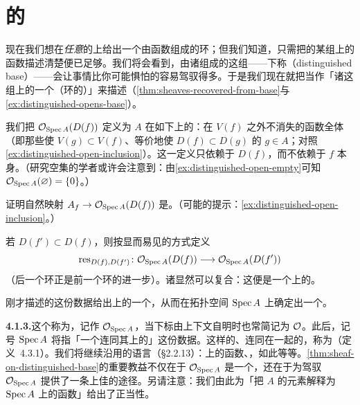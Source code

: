 
\section{\trAffineScheme{}的\trStructureSheaf}

现在我们想在\emph{任意}的\trOpenSet{}上给出一个由函数组成的环；但我们知道，只需把\trTopology{}的某组\trBase{}上的函数描述清楚便已足够。我们将会看到，由诸\trDistinguishedOpen{}组成的这组\trBase——下称\textbf{\trDistinguishedBase{}}（distinguished base）——会让事情比你可能惧怕的容易驾驭得多。于是我们现在就把\trStructureSheaf{}当作「诸\trDistinguishedOpen{}这组\trBase{}上的一个（环的）\trSheaf」来描述（\cref{thm:sheaves-recovered-from-base}与\cref{ex:distinguished-opens-base}）。

\begin{definition}\label{thm:structure-sheaf-definition}
我们把 $\mathcal{O}_{\operatorname{Spec} A}(D(f))$ 定义为 $A$ 在如下\trMultiplicativeSubset{}上的\trLocalization：在 $V(f)$ 之外不消失的函数全体（即那些使 $V(g)\subset V(f)$、等价地使 $D(f)\subset D(g)$ 的 $g\in A$；对照\cref{ex:distinguished-open-inclusion}）。这一定义只依赖于 $D(f)$，而不依赖于 $f$ 本身。（研究空集的学者或许会注意到：由\cref{ex:distinguished-open-empty}可知 $\mathcal{O}_{\operatorname{Spec} A}(\varnothing)=\{0\}$。）
\end{definition}

\begin{exercise}[极好练习]\label{ex:af-structure-sheaf-isomorphism}
证明自然映射 $A_f\to\mathcal{O}_{\operatorname{Spec} A}(D(f))$ 是\trIsomorphism。（可能的提示：\cref{ex:distinguished-open-inclusion}。）
\end{exercise}

若 $D(f')\subset D(f)$，则按显而易见的方式定义\trRestrictionMap
\[
\mathrm{res}_{D(f),D(f')}\colon\mathcal{O}_{\operatorname{Spec} A}(D(f))\longrightarrow\mathcal{O}_{\operatorname{Spec} A}(D(f'))
\]
（后一个环正是前一个环的进一步\trLocalization）。诸\trRestrictionMap{}显然可以复合：这便是一个\trDistinguishedBase{}上的\trPresheaf。

\begin{theorem}\label{thm:sheaf-on-distinguished-base}
刚才描述的这份数据给出\trDistinguishedBase{}上的一个\trSheaf，从而在拓扑空间 $\operatorname{Spec} A$ 上确定出一个\trSheaf。
\end{theorem}

\textbf{4.1.3.}\quad 这个\trSheaf{}称为\textbf{\trStructureSheaf}，记作 $\mathcal{O}_{\operatorname{Spec} A}$，当下标由上下文自明时也常简记为 $\mathcal{O}$。此后，记号 $\operatorname{Spec} A$ 将指「一个\trTopologicalSpace{}连同其上的\trStructureSheaf」这份数据。这样的、连同\trStructureSheaf{}在一起的\trTopologicalSpace，称为\textbf{\trAffineScheme}（定义~4.3.1）。我们将继续沿用\trRingedSpace{}的语言（\S2.2.13）：\trOpenSet{}上的函数、\trGlobalSections，如此等等。\cref{thm:sheaf-on-distinguished-base}的重要教益不仅在于 $\mathcal{O}_{\operatorname{Spec} A}$ 是一个\trSheaf，还在于\trDistinguishedBase{}为驾驭 $\mathcal{O}_{\operatorname{Spec} A}$ 提供了一条上佳的途径。另请注意：我们由此为「把 $A$ 的元素解释为 $\operatorname{Spec} A$ 上的函数」给出了正当性。

